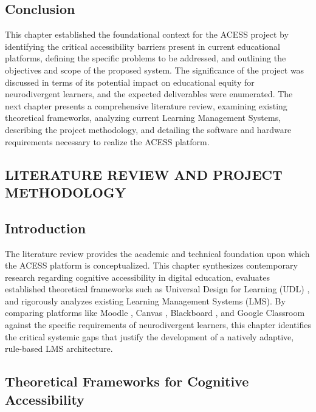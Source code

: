 \documentclass[12pt, oneside]{article} %
\begin{document}
\subsection{Conclusion}

This chapter established the foundational context for the ACESS project by identifying the critical accessibility barriers present in current educational platforms, defining the specific problems to be addressed, and outlining the objectives and scope of the proposed system. The significance of the project was discussed in terms of its potential impact on educational equity for neurodivergent learners, and the expected deliverables were enumerated. The next chapter presents a comprehensive literature review, examining existing theoretical frameworks, analyzing current Learning Management Systems, describing the project methodology, and detailing the software and hardware requirements necessary to realize the ACESS platform.



\newpage
\vfill \null
\thispagestyle{empty}
\begin{center}
\section{LITERATURE REVIEW AND PROJECT METHODOLOGY}
\end{center}
\vspace{2cm}

\subsection{Introduction}

The literature review provides the academic and technical foundation upon which the ACESS platform is conceptualized. This chapter synthesizes contemporary research regarding cognitive accessibility in digital education, evaluates established theoretical frameworks such as Universal Design for Learning (UDL) \cite{udl_guidelines}, and rigorously analyzes existing Learning Management Systems (LMS). By comparing platforms like Moodle \cite{moodle_software}, Canvas \cite{canvas_lms}, Blackboard \cite{blackboard_learn}, and Google Classroom \cite{google_classroom} against the specific requirements of neurodivergent learners, this chapter identifies the critical systemic gaps that justify the development of a natively adaptive, rule-based LMS architecture.

\subsection{Theoretical Frameworks for Cognitive Accessibility}
\end{document}

